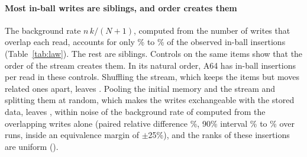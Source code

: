 \documentclass[sigconf, nonacm, review]{acmart}
\begin{document}
\paragraph{Most in-ball writes are siblings, and order creates them}
The background rate $n\,k/(N+1)$, computed from the number of writes
that overlap each read, accounts for only \% to
\% of the observed in-ball insertions
(Table~\ref{tab:law}). The rest are siblings. Controls on the
same items show that the order of the stream creates them. In its
natural order, A64 has  in-ball insertions
per read in these controls. Shuffling the stream, which keeps the items but moves
related ones apart, leaves . Pooling
the initial memory and the stream and splitting them at random, which
makes the writes exchangeable with the stored data, leaves
, within noise of the background rate of
 computed from the overlapping writes alone (paired relative difference
\%, 90\% interval \% to \% over  runs, inside an
equivalence margin of $\pm$25\%), and
the ranks of these insertions are uniform (\appLaw).
\end{document}
